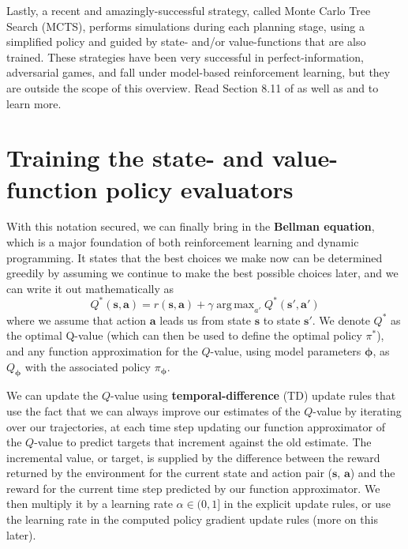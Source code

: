\documentclass{article}
\DeclareMathOperator*{\argmax}{arg\,max}
\begin{document}
Lastly, a recent and amazingly-successful strategy, called Monte Carlo Tree Search (MCTS), performs simulations during each planning stage, using a simplified policy and guided by state- and/or value-functions that are also trained. These strategies have been very successful in perfect-information, adversarial games, and fall under model-based reinforcement learning, but they are outside the scope of this overview. Read Section 8.11 of \cite{sutton_barto_rl} as well as \cite{go1} and \cite{go2} to learn more.

\section{Training the state- and value-function policy evaluators\label{sec:value_training}}

With this notation secured, we can finally bring in the \textbf{Bellman equation}, which is a major foundation of both reinforcement learning and dynamic programming. It states that the best choices we make now can be determined greedily by assuming we continue to make the best possible choices later, and we can write it out mathematically as
\begin{equation}\label{eq:bellman}
Q^\ast(\mathbf{s},\mathbf{a})=r(\mathbf{s},\mathbf{a})+\gamma \argmax_{a'}Q^\ast(\mathbf{s}',\mathbf{a}')
\end{equation}where we assume that action $\mathbf{a}$ leads us from state $\mathbf{s}$ to state $\mathbf{s}'$. We denote $Q^\ast$ as the optimal Q-value (which can then be used to define the optimal policy $\pi^\ast$), and any function approximation for the $Q$-value, using model parameters $\boldsymbol{\phi}$, as $Q_{\boldsymbol{\phi}}$ with the associated policy $\pi_{\boldsymbol{\phi}}$.

We can update the $Q$-value using \textbf{temporal-difference} (TD) update rules that use the fact that we can always improve our estimates of the $Q$-value by iterating over our trajectories, at each time step updating our function approximator of the $Q$-value to predict targets that increment against the old estimate. The incremental value, or target, is supplied by the difference between the  reward returned by the environment for the current state and action pair ($\mathbf{s}$, $\mathbf{a}$) and the reward for the current time step predicted by our function approximator. We then multiply it by a learning rate $\alpha\in(0,1]$ in the explicit update rules, or use the learning rate in the computed policy gradient update rules (more on this later). 
\end{document}
